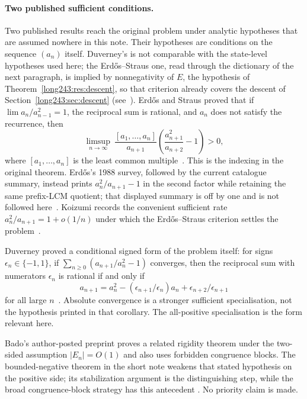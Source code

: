 \paragraph{Two published sufficient conditions.}
Two published results reach the original problem under analytic hypotheses that
are assumed nowhere in this note.  Their hypotheses are conditions on the
sequence $(a_n)$ itself.  Duverney's is not comparable with the state-level
hypotheses used here; the Erd\H{o}s--Straus one, read through the dictionary of
the next paragraph, is implied by nonnegativity of $E$, the hypothesis of
Theorem~\ref{long243:res:descent}, so that criterion already covers the descent of
Section~\ref{long243:sec:descent} (see~\cite[Cor.~4(1) and Prop.~1(1), pp.~14--15]{koizumi2025}).
Erd\H{o}s and Straus proved that if $\lim a_n/a_{n-1}^{2}=1$, the reciprocal
sum is rational, and $a_n$ does not satisfy the recurrence, then
\[
 \limsup_{n\to\infty}\ \frac{[a_1,\ldots,a_n]}{a_{n+1}}
 \left(\frac{a_{n+1}^{2}}{a_{n+2}}-1\right)>0,
\]
where $[a_1,\ldots,a_n]$ is the least common
multiple~\cite[Theorem~3, p.~132]{erdosstraus1964}.  This is the indexing in
the original theorem.  Erd\H{o}s's 1988 survey, followed by the current
catalogue summary, instead prints $a_n^2/a_{n+1}-1$ in the second factor while
retaining the same prefix-LCM quotient; that displayed summary is off by one
and is not followed here~\cite[p.~105]{erdos1988}\cite{erdosproblems}.
Koizumi records the convenient sufficient rate
$a_n^2/a_{n+1}=1+o(1/n)$ under which the Erd\H{o}s--Straus criterion settles
the problem~\cite[Remark~3, p.~16]{koizumi2025}.

Duverney proved a
conditional signed form of the problem itself: for signs
$\epsilon_n\in\{-1,1\}$, if
$\sum_{n\ge0}(a_{n+1}/a_n^{2}-1)$ converges, then the reciprocal sum with
numerators $\epsilon_n$ is rational if and only if
\[
 a_{n+1}=a_n^2-(\epsilon_{n+1}/\epsilon_n)a_n
             +\epsilon_{n+2}/\epsilon_{n+1}
\]
for all large $n$~\cite[Corollary~3.2, p.~287]{duverney2001}.  Absolute
convergence is a stronger sufficient specialisation, not the hypothesis
printed in that corollary.  The all-positive specialisation is the form
relevant here.

Bado's author-posted preprint proves a related rigidity theorem under the
two-sided assumption $|E_n|=O(1)$ and also uses forbidden congruence blocks.
The bounded-negative theorem in the short note weakens that stated hypothesis
on the positive side; its stabilization argument is the distinguishing step,
while the broad congruence-block strategy has this antecedent
\cite[Theorem~5.1]{bado2026}.  No priority claim is made.

